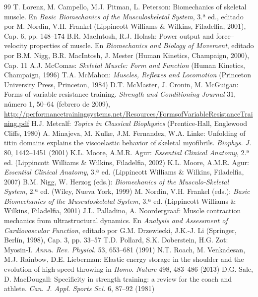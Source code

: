 \documentclass[12pt]{book}
\begin{document}
\begin{thebibliography}{99}
   T. Lorenz, M. Campello, M.J. Pitman, L. Peterson: Biomechanics of skeletal muscle. En \textit{Basic Biomechanics of the Musculoskeletal System}, 3.ª ed., editado por M. Nordin, V.H. Frankel (Lippincott Williams \& Wilkins, Filadelfia, 2001), Cap. 6, pp. 148--174
   B.R. MacIntosh, R.J. Holash: Power output and force--velocity properties of muscle. En \textit{Biomechanics and Biology of Movement}, editado por B.M. Nigg, B.R. MacIntosh, J. Mester (Human Kinetics, Champaign, 2000), Cap. 11
   A.J. McComas: \textit{Skeletal Muscle: Form and Function} (Human Kinetics, Champaign, 1996)
   T.A. McMahon: \textit{Muscles, Reflexes and Locomotion} (Princeton University Press, Princeton, 1984)
   D.T. McMaster, J. Cronin, M. McGuigan: Forms of variable resistance training. \textit{Strength and Conditioning Journal} 31, número 1, 50--64 (febrero de 2009), \url{http://performancetrainingsystems.net/Resources/FormsofVariableResistanceTraining.pdf}
   H.J. Metcalf: \textit{Topics in Classical Biophysics} (Prentice-Hall, Englewood Cliffs, 1980)
   A. Minajeva, M. Kulke, J.M. Fernandez, W.A. Linke: Unfolding of titin domains explains the viscoelastic behavior of skeletal myofibrils. \textit{Biophys. J.} 80, 1442--1451 (2001)
   K.L. Moore, A.M.R. Agur: \textit{Essential Clinical Anatomy}, 2.ª ed. (Lippincott Williams \& Wilkins, Filadelfia, 2002)
   K.L. Moore, A.M.R. Agur: \textit{Essential Clinical Anatomy}, 3.ª ed. (Lippincott Williams \& Wilkins, Filadelfia, 2007)
   B.M. Nigg, W. Herzog (eds.): \textit{Biomechanics of the Musculo-Skeletal System}, 2.ª ed. (Wiley, Nueva York, 1999)
   M. Nordin, V.H. Frankel (eds.): \textit{Basic Biomechanics of the Musculoskeletal System}, 3.ª ed. (Lippincott Williams \& Wilkins, Filadelfia, 2001)
   J.L. Palladino, A. Noordergraaf: Muscle contraction mechanics from ultrastructural dynamics. En \textit{Analysis and Assessment of Cardiovascular Function}, editado por G.M. Drzewiecki, J.K.-J. Li (Springer, Berlín, 1998), Cap. 3, pp. 33--57
   T.D. Pollard, S.K. Doberstein, H.G. Zot: Myosin-I. \textit{Annu. Rev. Physiol.} 53, 653--681 (1991)
   N.T. Roach, M. Venkadesan, M.J. Rainbow, D.E. Lieberman: Elastic energy storage in the shoulder and the evolution of high-speed throwing in \textit{Homo}. \textit{Nature} 498, 483--486 (2013)
   D.G. Sale, D. MacDougall: Specificity in strength training: a review for the coach and athlete. \textit{Can. J. Appl. Sports Sci.} 6, 87--92 (1981)

\end{thebibliography}
\end{document}
